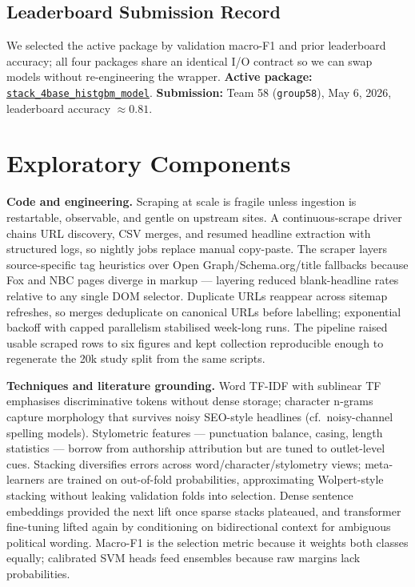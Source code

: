 \documentclass[10pt]{article}
\begin{document}
\subsection{Leaderboard Submission Record}
We selected the active package by validation macro-F1 and prior leaderboard accuracy; all four packages share an identical I/O contract so we can swap models without re-engineering the wrapper. \textbf{Active package:} \href{https://github.com/Maxwell938623/news-source-classification/tree/exploration/submission/stack_4base_histgbm_model}{\texttt{stack\_4base\_histgbm\_model}}. \textbf{Submission:} Team 58 (\texttt{group58}), May 6, 2026, leaderboard accuracy $\approx 0.81$.

\section{Exploratory Components}

\textbf{Code and engineering.} Scraping at scale is fragile unless ingestion is restartable, observable, and gentle on upstream sites. A continuous-scrape driver chains URL discovery, CSV merges, and resumed headline extraction with structured logs, so nightly jobs replace manual copy-paste. The scraper layers source-specific tag heuristics over Open Graph/Schema.org/title fallbacks because Fox and NBC pages diverge in markup --- layering reduced blank-headline rates relative to any single DOM selector. Duplicate URLs reappear across sitemap refreshes, so merges deduplicate on canonical URLs before labelling; exponential backoff with capped parallelism stabilised week-long runs. The pipeline raised usable scraped rows to six figures and kept collection reproducible enough to regenerate the 20k study split from the same scripts.

\textbf{Techniques and literature grounding.} Word TF-IDF with sublinear TF emphasises discriminative tokens without dense storage; character n-grams capture morphology that survives noisy SEO-style headlines (cf.\ noisy-channel spelling models). Stylometric features --- punctuation balance, casing, length statistics --- borrow from authorship attribution but are tuned to outlet-level cues. Stacking diversifies errors across word/character/stylometry views; meta-learners are trained on out-of-fold probabilities, approximating Wolpert-style stacking without leaking validation folds into selection. Dense sentence embeddings provided the next lift once sparse stacks plateaued, and transformer fine-tuning lifted again by conditioning on bidirectional context for ambiguous political wording. Macro-F1 is the selection metric because it weights both classes equally; calibrated SVM heads feed ensembles because raw margins lack probabilities.
\end{document}

